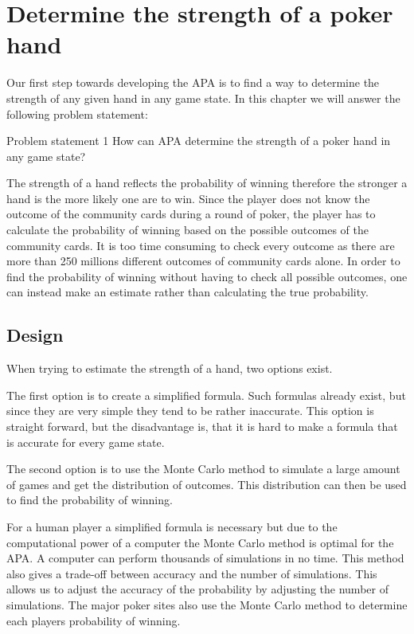 \section{Determine the strength of a poker hand}
\label{sec:part1}
Our first step towards developing the APA is to find a way to determine the strength of any given hand in any game state. In this chapter we will answer the following problem statement: 

\vspace{4mm}
\begin{statementBox2}{Problem statement 1}
How can APA determine the strength of a poker hand in any game state?
\end{statementBox2}
\vspace{4mm}

The strength of a hand reflects the probability of winning therefore the stronger a hand is the more likely one are to win. Since the player does not know the outcome of the community cards during a round of poker, the player has to calculate the probability of winning based on the possible outcomes of the community cards. It is too time consuming to check every outcome as there are more than 250 millions different outcomes of community cards alone. In order to find the probability of winning without having to check all possible outcomes, one can instead make an estimate rather than calculating the true probability. 

\subsection{Design}
When trying to estimate the strength of a hand, two options exist.

The first option is to create a simplified formula. Such formulas already exist, but since they are very simple they tend to be rather inaccurate. This option is straight forward, but the disadvantage is, that it is hard to make a formula that is accurate for every game state.

The second option is to use the Monte Carlo method to simulate a large amount of games and get the distribution of outcomes. This distribution can then be used to find the probability of winning.

For a human player a simplified formula is necessary but due to the computational power of a computer the Monte Carlo method is optimal for the APA. A computer can perform thousands of simulations in no time. This method also gives a trade-off between accuracy and the number of simulations. This allows us to adjust the accuracy of the probability by adjusting the number of simulations. The major poker sites also use the Monte Carlo method to determine each players probability of winning.

